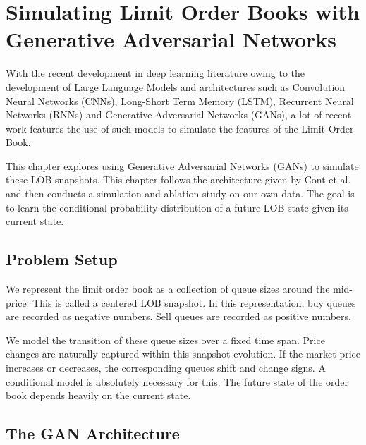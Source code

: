 \chapter{Simulating Limit Order Books with Generative Adversarial Networks}

With the recent development in deep learning literature owing to the development of Large Language Models and architectures such as Convolution Neural Networks (CNNs), Long-Short Term Memory (LSTM), Recurrent Neural Networks (RNNs) and Generative Adversarial Networks (GANs), a lot of recent work features the use of such models to simulate the features of the Limit Order Book.

 This chapter explores using Generative Adversarial Networks (GANs) to simulate these LOB snapshots. This chapter follows the architecture given by Cont et al. \cite{cont2023lobsimulationgan} and then conducts a simulation and ablation study on our own data. The goal is to learn the conditional probability distribution of a future LOB state given its current state. 

\section{Problem Setup}

We represent the limit order book as a collection of queue sizes around the mid-price. This is called a centered LOB snapshot. In this representation, buy queues are recorded as negative numbers. Sell queues are recorded as positive numbers. 

We model the transition of these queue sizes over a fixed time span. Price changes are naturally captured within this snapshot evolution. If the market price increases or decreases, the corresponding queues shift and change signs. A conditional model is absolutely necessary for this. The future state of the order book depends heavily on the current state. 

\section{The GAN Architecture}

